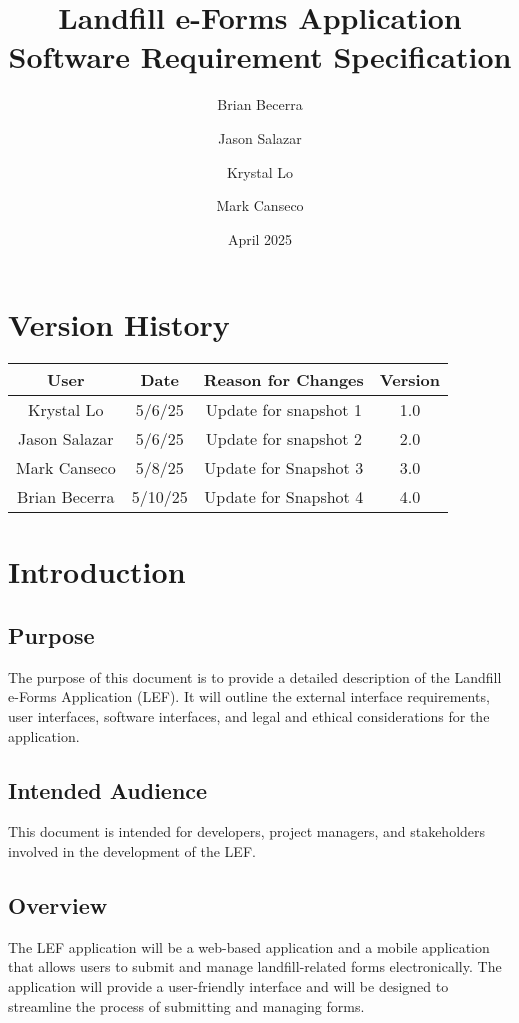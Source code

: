 \documentclass[12pt]{article}
\title{Landfill e-Forms Application\\
Software Requirement Specification}
\author{
    Brian Becerra\\
    \and
    Jason Salazar\\
    \and
    Krystal Lo\\
    \and
    Mark Canseco\\
    }
\date{April 2025}
\begin{document}
\begin{titlepage}
\maketitle
\thispagestyle{empty}
\end{titlepage}

\thispagestyle{empty}
\tableofcontents
\newpage

\section*{Version History}
\begin{table}[ht]
    \centering
    \begin{tabular}{|c|c|c|c|}
    \hline
    \textbf{User} & \textbf{Date} & \textbf{Reason for Changes} & \textbf{Version}\\
    \hline
         Krystal Lo & 5/6/25  & Update for snapshot 1 & 1.0\\
    \hline
        Jason Salazar & 5/6/25 & Update for snapshot 2 & 2.0\\
    \hline
         Mark Canseco&  5/8/25& Update for Snapshot 3 & 3.0\\
    \hline
         Brian Becerra& 5/10/25 & Update for Snapshot 4 & 4.0\\
    \hline
    \end{tabular}
\end{table}
\newpage

\section{Introduction}
\subsection{Purpose}
The purpose of this document is to provide a detailed description of the Landfill e-Forms Application (LEF). It will outline the external interface requirements, user interfaces, software interfaces, and legal and ethical considerations for the application. 
\subsection{Intended Audience}
This document is intended for developers, project managers, and stakeholders involved in the development of the LEF.
\subsection{Overview}
The LEF application will be a web-based application and a mobile application that allows users to submit and manage landfill-related forms electronically. The application will provide a user-friendly interface and will be designed to streamline the process of submitting and managing forms.
\newpage
\end{document}
